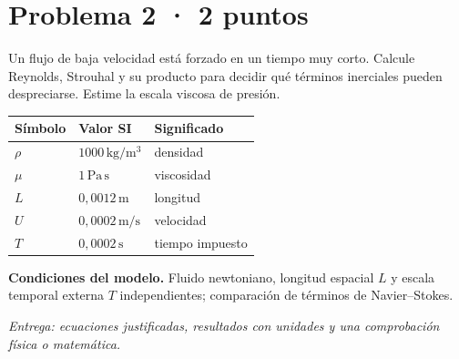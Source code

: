 \par\medskip\noindent\begin{minipage}{\linewidth}

\section{Problema 2 · 2 puntos}

Un flujo de baja velocidad está forzado en un tiempo muy corto. Calcule Reynolds, Strouhal y su producto para decidir qué términos inerciales pueden despreciarse. Estime la escala viscosa de presión.

\begin{tabular}{@{}p{.15\linewidth}p{.23\linewidth}p{.54\linewidth}@{}}
\toprule Símbolo & Valor SI & Significado\\\midrule
$\rho$ & $1000\,\mathrm{kg/m^3}$ & densidad\\
$\mu$ & $1\,\mathrm{Pa\,s}$ & viscosidad\\
$L$ & $0{,}0012\,\mathrm{m}$ & longitud\\
$U$ & $0{,}0002\,\mathrm{m/s}$ & velocidad\\
$T$ & $0{,}0002\,\mathrm{s}$ & tiempo impuesto\\
\bottomrule\end{tabular}

\par\medskip\textbf{Condiciones del modelo.} Fluido newtoniano, longitud espacial $L$ y escala temporal externa $T$ independientes; comparación de términos de Navier--Stokes.

\par\textit{Entrega: ecuaciones justificadas, resultados con unidades y una comprobación física o matemática.}

\end{minipage}\par\medskip

